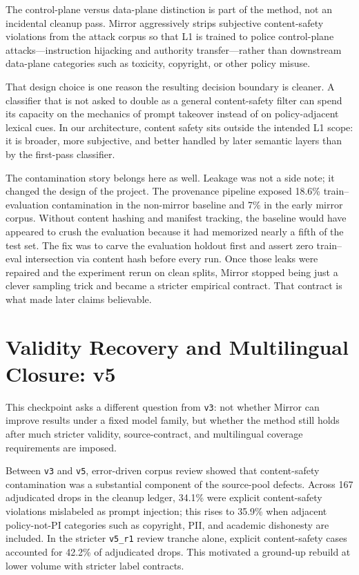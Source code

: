 \documentclass[11pt,a4paper]{article}
\begin{document}
The control-plane versus data-plane distinction is part of the method,
not an incidental cleanup pass. Mirror aggressively strips subjective
content-safety violations from the attack corpus so that L1 is trained
to police control-plane attacks---instruction hijacking and authority
transfer---rather than downstream data-plane categories such as
toxicity, copyright, or other policy misuse.

That design choice is one reason the resulting decision boundary is
cleaner. A classifier that is not asked to double as a general
content-safety filter can spend its capacity on the mechanics of prompt
takeover instead of on policy-adjacent lexical cues. In our
architecture, content safety sits outside the intended L1 scope: it is
broader, more subjective, and better handled by later semantic layers
than by the first-pass classifier.

The contamination story belongs here as well. Leakage was not a side
note; it changed the design of the project. The provenance pipeline
exposed 18.6\% train--evaluation contamination in the non-mirror
baseline and 7\% in the early mirror corpus. Without content hashing and
manifest tracking, the baseline would have appeared to crush the
evaluation because it had memorized nearly a fifth of the test set. The
fix was to carve the evaluation holdout first and assert zero train--eval
intersection via content hash before every run. Once those leaks were
repaired and the experiment rerun on clean splits, Mirror stopped being
just a clever sampling trick and became a stricter empirical contract.
That contract is what made later claims believable.

\section{Validity Recovery and Multilingual Closure: v5}
\label{sec:v5}

This checkpoint asks a different question from \texttt{v3}: not whether
Mirror can improve results under a fixed model family, but whether the
method still holds after much stricter validity, source-contract, and
multilingual coverage requirements are imposed.

Between \texttt{v3} and \texttt{v5}, error-driven corpus review showed
that content-safety contamination was a substantial component of the
source-pool defects. Across 167 adjudicated drops in the cleanup ledger,
34.1\% were explicit content-safety violations mislabeled as prompt
injection; this rises to 35.9\% when adjacent policy-not-PI categories
such as copyright, PII, and academic dishonesty are included. In the
stricter \texttt{v5\_r1} review tranche alone, explicit content-safety
cases accounted for 42.2\% of adjudicated drops. This motivated a
ground-up rebuild at lower volume with stricter label contracts.
\end{document}
